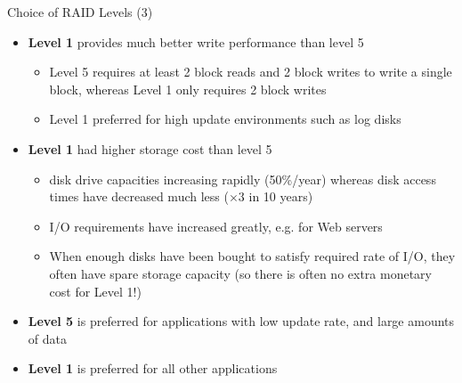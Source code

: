 \documentclass[aspectratio=169, xcolor=dvipsnames]{beamer}
\begin{document}
\begin{frame}{Choice of RAID Levels (3)}
    \begin{itemize}[<+->]
        \item \textbf{Level 1} provides much better write performance than level 5
        \begin{itemize}
            \item[$\triangleright$] Level 5 requires at least 2 block reads and 2 block writes to write a single block, whereas Level 1 only requires 2 block writes
            \item[$\triangleright$] Level 1 preferred for high update environments such as log disks
        \end{itemize}
        \item \textbf{Level 1} had higher storage cost than level 5
        \begin{itemize}
            \item[$\triangleright$] disk drive capacities increasing rapidly (50\%/year) whereas disk access times have decreased much less ($\times 3$ in 10 years)
            \item[$\triangleright$] I/O requirements have increased greatly, e.g. for Web servers
            \item[$\triangleright$] When enough disks have been bought to satisfy required rate of I/O, they often have spare storage capacity (so there is often no extra monetary cost for Level 1!)
        \end{itemize}
        \item \textbf{Level 5} is preferred for applications with low update rate, and large amounts of data
        \item \textbf{Level 1} is preferred for all other applications
    \end{itemize}
\end{frame}
\end{document}
